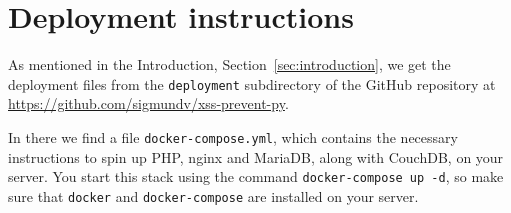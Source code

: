 \documentclass[10pt,journal,compsoc]{IEEEtran}
\begin{document}

%
\clearpage


\appendices

\clearpage

\section{Deployment instructions}

As mentioned in the Introduction, Section~\ref{sec:introduction}, we get the deployment files from the \verb|deployment|
subdirectory of the GitHub repository at \url{https://github.com/sigmundv/xss-prevent-py}.

In there we find a file \verb|docker-compose.yml|, which contains the necessary instructions to spin up PHP, nginx and
MariaDB, along with CouchDB, on your server. You start this stack using the command \verb|docker-compose up -d|, so make
sure that \verb|docker| and \verb|docker-compose| are installed on your server.
\end{document}
